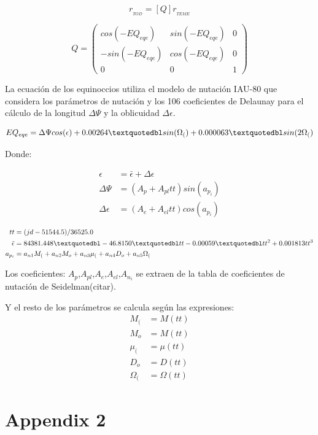 \begin{equation}
 r_{_{TOD}} = [Q] r_{_{TEME}}
\end{equation}


 \[ Q =
\left( \begin{array}{ccc}
 cos(-EQ_{eqe}) & sin(-EQ_{eqe}) &  0 \\ 
 -sin(-EQ_{eqe}) & cos(-EQ_{eqe}) &  0 \\
 0 & 0 & 1
\end{array} \right) \] 


La ecuaci\'on de los equinoccios utiliza el modelo de nutaci\'on IAU-80 que considera los par\'ametros de nutaci\'on y los 106 coeficientes de Delaunay para el c\'alculo de la longitud $\Delta \Psi$ y la oblicuidad $\Delta \epsilon$.

\begin{equation}
 EQ_{eqe}=\Delta \Psi cos({\epsilon}) + 0.00264 \textquotedbl sin(\Omega_{(}) + 0.000063 \textquotedbl sin (2 \Omega_{(})
\end{equation}

Donde:

\begin{align*}
 \epsilon &= {\bar{\epsilon}} + \Delta \epsilon\\
 \Delta \Psi &= (A_{p} + A_{pl} tt) sin(a_{p_{i}})\\
 \Delta \epsilon &= (A_{e} + A_{el} tt) cos(a_{p_{i}})
\end{align*}

\begin{align*}
 tt &= (jd - 51544.5)/36525.0\\
 {\bar{\epsilon}} &= 84381.448 \textquotedbl - 46.8150 \textquotedbl tt - 0.00059 \textquotedbl tt^{2} + 0.001813 tt^{3}\\
 a_{p_{i}} &= a_{n1}M_{(}+a_{n2}M_{o}+a_{n3}\mu_{(}+a_{n4}D_{o}+a_{n5}\Omega_{(}
\end{align*}

Los coeficientes: $A_{p}$,$A_{pl}$,$A_{e}$,$A_{el}$,$A_{n_{i}}$ se extraen de la tabla de coeficientes de nutaci\'on de Seidelman(citar).

Y el resto de los par\'ametros se calcula seg\'un las expresiones:\\

\begin{align*}
 M_{(} & = M(tt)\\
 M_{o} & = M(tt)\\
 \mu_{(} &= \mu(tt)\\
 D_{o} &= D(tt)\\
 \Omega_{(} &= \Omega(tt)
\end{align*}

\section{Appendix 2}
\label{App2}

\endinput